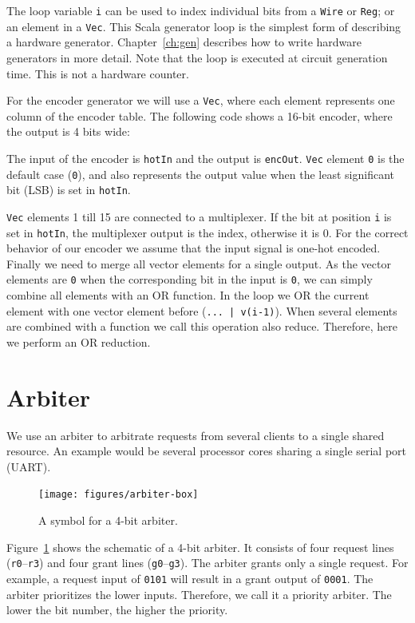 \documentclass[%
    10pt,
    headinclude, footexclude,
    openright, %
    notitlepage,
    cleardoubleempty,
    headsepline,
    pointlessnumbers,
    bibtotoc, idxtotoc,
    ]{scrbook}
\newcommand{\code}[1]{{\small{\texttt{#1}}}}
\begin{document}

\noindent The loop variable \code{i} can be used to index individual bits from a \code{Wire} or
\code{Reg}; or an element in a \code{Vec}. This Scala generator loop is the simplest form of describing
a hardware generator. Chapter~\ref{ch:gen} describes how to write hardware generators in more detail.
Note that the loop is executed at circuit generation time. This is not a hardware counter.

For the encoder generator we will use a \code{Vec}, where each element represents one column
of the encoder table. The following code shows a 16-bit encoder, where the output is 4 bits wide:


\noindent The input of the encoder is \code{hotIn} and the output is \code{encOut}.
\code{Vec} element \code{0} is the default case (\code{0}), and also represents the output
value when the least significant bit (LSB) is set in \code{hotIn}.

\code{Vec} elements 1 till 15 are connected to a multiplexer. If the bit at position \code{i}
is set in \code{hotIn}, the multiplexer output is the index, otherwise it is 0. For the correct
behavior of our encoder we assume that the input signal is one-hot encoded.
Finally we need to merge all vector elements for a single output. As the vector elements
are \code{0} when the corresponding bit in the input is \code{0}, we can simply combine
all elements with an OR function. In the loop we OR the current element with one vector
element before (\code{... | v(i-1)}). When several elements are combined with a function
we call this operation also reduce. Therefore, here we perform an OR reduction.

\section{Arbiter}
\label{sec:arbiter}


We use an arbiter to arbitrate requests from several clients to a single shared resource.
An example would be several processor cores sharing a single serial port (UART).

\begin{figure}
  \centering
  \texttt{[image: figures/arbiter-box]}
  \caption{A symbol for a 4-bit arbiter.}
  \label{fig:arbiter-box}
\end{figure}

Figure~\ref{fig:arbiter-box} shows the schematic of a 4-bit arbiter.
It consists of four request lines (\code{r0}--\code{r3}) and four grant lines
(\code{g0}--\code{g3}). The arbiter grants only a single request.
For example, a request input of \code{0101} will result in
a grant output of \code{0001}. The arbiter prioritizes the lower
inputs. Therefore, we call it a priority arbiter. The lower the bit number,
the higher the priority.
\end{document}

